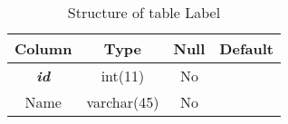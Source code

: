 %
%
\begin{longtable}{|c|c|c|c|} 
\caption{Structure of table Label} 
\label{tab:Label-structure} \\
\hline 
\multicolumn{1}{|c|}{\textbf{Column}} & \multicolumn{1}{|c|}{\textbf{Type}} & \multicolumn{1}{|c|}{\textbf{Null}} & \multicolumn{1}{|c|}{\textbf{Default}} \\ 
\hline
\textbf{\textit{id}} & int(11) & No &  \\ 
\hline 
Name & varchar(45) & No &  \\ 
\hline 
\end{longtable}

%
%

%
%

%
%

